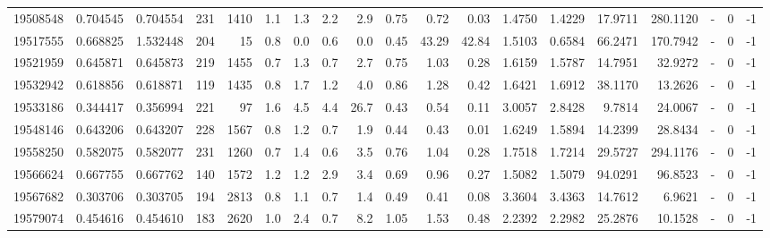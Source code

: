 \begin{tabular}{rrrrrrrrrrrrrrrrlrr}
  19508548 & 0.704545 &   0.704554 &  231 & 1410 &      1.1 &      1.3 &     2.2 &      2.9 &       0.75 &        0.72 &        0.03 &  1.4750 &  1.4229 &   17.9711 &  280.1120 &             - &        0 &         -1 \\
  19517555 & 0.668825 &   1.532448 &  204 &   15 &      0.8 &      0.0 &     0.6 &      0.0 &       0.45 &       43.29 &       42.84 &  1.5103 &  0.6584 &   66.2471 &  170.7942 &             - &        0 &         -1 \\
  19521959 & 0.645871 &   0.645873 &  219 & 1455 &      0.7 &      1.3 &     0.7 &      2.7 &       0.75 &        1.03 &        0.28 &  1.6159 &  1.5787 &   14.7951 &   32.9272 &             - &        0 &         -1 \\
  19532942 & 0.618856 &   0.618871 &  119 & 1435 &      0.8 &      1.7 &     1.2 &      4.0 &       0.86 &        1.28 &        0.42 &  1.6421 &  1.6912 &   38.1170 &   13.2626 &             - &        0 &         -1 \\
  19533186 & 0.344417 &   0.356994 &  221 &   97 &      1.6 &      4.5 &     4.4 &     26.7 &       0.43 &        0.54 &        0.11 &  3.0057 &  2.8428 &    9.7814 &   24.0067 &             - &        0 &         -1 \\
  19548146 & 0.643206 &   0.643207 &  228 & 1567 &      0.8 &      1.2 &     0.7 &      1.9 &       0.44 &        0.43 &        0.01 &  1.6249 &  1.5894 &   14.2399 &   28.8434 &             - &        0 &         -1 \\
  19558250 & 0.582075 &   0.582077 &  231 & 1260 &      0.7 &      1.4 &     0.6 &      3.5 &       0.76 &        1.04 &        0.28 &  1.7518 &  1.7214 &   29.5727 &  294.1176 &             - &        0 &         -1 \\
  19566624 & 0.667755 &   0.667762 &  140 & 1572 &      1.2 &      1.2 &     2.9 &      3.4 &       0.69 &        0.96 &        0.27 &  1.5082 &  1.5079 &   94.0291 &   96.8523 &             - &        0 &         -1 \\
  19567682 & 0.303706 &   0.303705 &  194 & 2813 &      0.8 &      1.1 &     0.7 &      1.4 &       0.49 &        0.41 &        0.08 &  3.3604 &  3.4363 &   14.7612 &    6.9621 &             - &        0 &         -1 \\
  19579074 & 0.454616 &   0.454610 &  183 & 2620 &      1.0 &      2.4 &     0.7 &      8.2 &       1.05 &        1.53 &        0.48 &  2.2392 &  2.2982 &   25.2876 &   10.1528 &             - &        0 &         -1 \\

\end{tabular}
